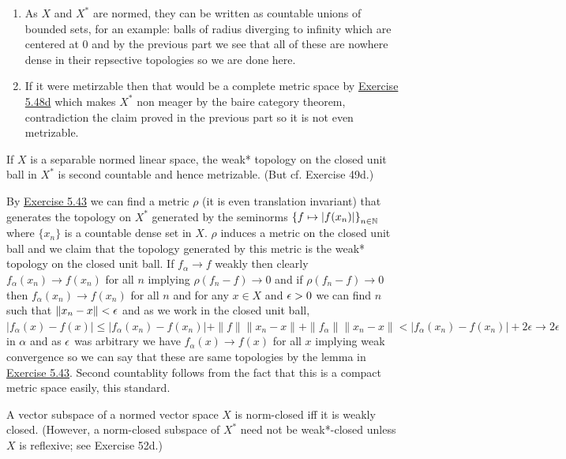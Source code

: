 \documentclass[12pt,a4paper]{article}
\begin{document}
\begin{solution}
\begin{enumerate}[label=\alph*.]
        \item As $X$ and $X^*$ are normed, they can be written as countable unions of bounded sets, for an example: balls of radius diverging to infinity which are centered at $0$ and by the previous part we see that all of these are nowhere dense in their repsective topologies so we are done here. 
        \item If it were metirzable then that would be a complete metric space by \hyperref[prob:5-48]{Exercise 5.48d} which makes $X^*$ non meager by the baire category theorem, contradiction the claim proved in the previous part so it is not even metrizable.  
    \end{enumerate}
\end{solution}
\begin{problem}\label{prob:5-50}
If $X$ is a separable normed linear space, the weak* topology on the closed unit ball in $X^*$ is second countable and hence metrizable. (But cf. Exercise 49d.)
\end{problem}
\begin{solution}
    By \hyperref[prob:5-43]{Exercise 5.43} we can find a metric $\rho$ (it is even translation invariant) that generates the topology on $X^*$ generated by the seminorms $ \qty{f\mapsto|f(x_n)|}_{n\in\mathbb{N}}$ where $\{x_n\}$ is a countable dense set in $X.$ 
    $\rho$ induces a metric on the closed unit ball and we claim that the topology generated by this metric is the weak* topology on the closed unit ball. 
    If $f_\alpha\to f$ weakly then clearly $f_\alpha(x_n)\to f(x_n)$ for all $n$ implying $\rho(f_n-f)\to 0$ and if $\rho(f_n-f)\to 0$ then $f_\alpha(x_n)\to f(x_n)$ for all $n$ and for any $x\in X$ and $\epsilon>0$ we can find $n$ such that $\|x_n-x\|<\epsilon$ and as we work in the closed unit ball, $|f_\alpha(x)-f(x)|\leq|f_\alpha(x_n)-f(x_n)|+\|f\|\|x_n-x\|+\|f_\alpha\|\|x_n-x\|<|f_\alpha(x_n)-f(x_n)|+2\epsilon\to 2\epsilon$ in $\alpha$ and as $\epsilon$ was arbitrary we have $f_\alpha(x)\to f(x)$ for all $x$ implying weak convergence so we can say that these are same topologies by the lemma in \hyperref[prob:5-43]{Exercise 5.43}. 
    Second countablity follows from the fact that this is a compact metric space easily, this standard. 
\end{solution}
\begin{problem}\label{prob:5-51}
A vector subspace of a normed vector space $X$ is norm-closed iff it is weakly closed. (However, a norm-closed subspace of $X^*$ need not be weak*-closed unless $X$ is reflexive; see Exercise 52d.)
\end{problem}
\end{document}
